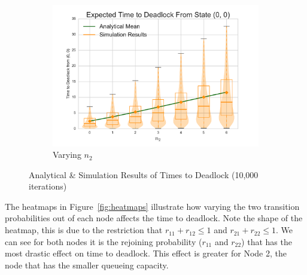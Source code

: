 \documentclass{article}
\begin{document}
\begin{figure}[!htbp]
\begin{subfigure}[b]{0.5\textwidth}
  \includegraphics[width=\textwidth]{images/vary_n2fb}
  \caption{Varying $n_2$}
  \label{fig:timestodeadlockfb_n2}
\end{subfigure}
\caption{Analytical \& Simulation Results of Times to Deadlock (10,000 iterations)}
\label{fig:timestodeadlockfeedback}
\end{figure}

The heatmaps in Figure~\ref{fig:heatmaps} illustrate how varying the two transition probabilities out of each node affects the time to deadlock.
Note the shape of the heatmap, this is due to the restriction that $r_{11} + r_{12} \leq 1$ and $r_{21} + r_{22} \leq 1$.
We can see for both nodes it is the rejoining probability ($r_{11}$ and $r_{22}$) that has the most drastic effect on time to deadlock.
This effect is greater for Node 2, the node that has the smaller queueing capacity.
\end{document}
